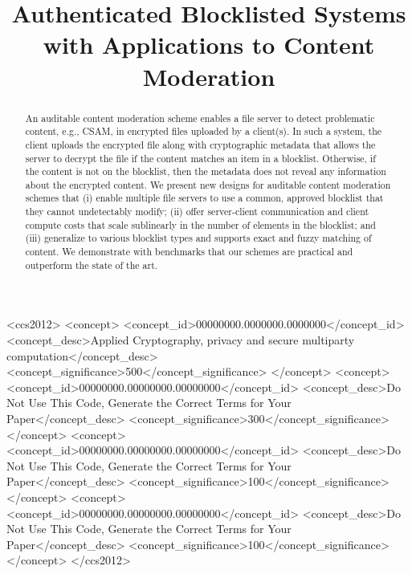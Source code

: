 \documentclass[sigconf,anonymous,review]{acmart}
\begin{document}
\title{Authenticated Blocklisted Systems with Applications to Content Moderation}



\begin{abstract}
An auditable content moderation scheme enables a file server to detect problematic content, e.g., CSAM, in encrypted files uploaded by a client(s). In such a system, the client uploads the encrypted file along with cryptographic metadata that allows the server to decrypt the file if the content matches an item in a blocklist. Otherwise, if the content is not on the blocklist, then the metadata does not reveal any information about the encrypted content.  We present new designs for auditable content moderation schemes that (i) enable multiple file servers to use a common, approved blocklist that they cannot undetectably modify; (ii) offer server-client communication and client compute costs that scale sublinearly in the number of elements in the blocklist; and (iii) generalize to various blocklist types and supports exact and fuzzy matching of content.  We demonstrate with benchmarks that our schemes are practical and outperform the state of the art. 
\end{abstract}



\begin{CCSXML}
<ccs2012>
 <concept>
  <concept_id>00000000.0000000.0000000</concept_id>
  <concept_desc>Applied Cryptography, privacy and secure multiparty computation</concept_desc>
  <concept_significance>500</concept_significance>
 </concept>
 <concept>
  <concept_id>00000000.00000000.00000000</concept_id>
  <concept_desc>Do Not Use This Code, Generate the Correct Terms for Your Paper</concept_desc>
  <concept_significance>300</concept_significance>
 </concept>
 <concept>
  <concept_id>00000000.00000000.00000000</concept_id>
  <concept_desc>Do Not Use This Code, Generate the Correct Terms for Your Paper</concept_desc>
  <concept_significance>100</concept_significance>
 </concept>
 <concept>
  <concept_id>00000000.00000000.00000000</concept_id>
  <concept_desc>Do Not Use This Code, Generate the Correct Terms for Your Paper</concept_desc>
  <concept_significance>100</concept_significance>
 </concept>
</ccs2012>
\end{CCSXML}

\end{document}

